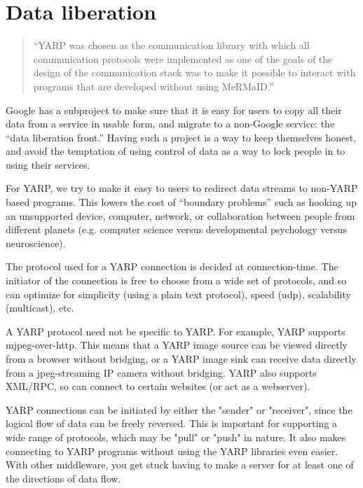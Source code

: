 \documentclass[letterpaper]{article}
\begin{document}
\section{Data liberation}

\begin{quote}
``YARP was chosen as the communication library with
which all communication protocols were implemented as
one of the goals of the design of the communication stack
was to make it possible to interact with programs that are
developed without using MeRMaID.'' \cite{barbosa09mermaid}
\end{quote}


Google has a subproject to make sure that it is easy for users to copy
all their data from a service in usable form, and migrate to a
non-Google service: the ``data liberation front.''  Having such 
a project is a way to keep themselves honest, and avoid the 
temptation of using control of data as a way to lock people in to
using their services.

For YARP, we try to make it easy to users to redirect data streams to
non-YARP based programs.  This lowers the cost of ``boundary
problems'' such as hooking up an unsupported device, computer,
network, or collaboration between people from different planets
(e.g. computer science versus developmental psychology versus
neuroscience).

The protocol used for a YARP connection is decided at connection-time.
The initiator of the connection is free to choose from a wide set of
protocols, and so can optimize for simplicity (using a plain text
protocol), speed (udp), scalability (multicast), etc.

A YARP protocol need not be specific to YARP.  For example, YARP
supports mjpeg-over-http.  This means that a YARP image source can be
viewed directly from a browser without bridging, or a YARP image sink
can receive data directly from a jpeg-streaming IP camera without
bridging.  YARP also supports XML/RPC, so can connect to certain
websites (or act as a webserver).

YARP connections can be initiated by either the "sender" or
"receiver", since the logical flow of data can be freely reversed.
This is important for supporting a wide range of protocols, which may
be "pull" or "push" in nature.  It also makes connecting to YARP
programs without using the YARP libraries even easier.  With other
middleware, you get stuck having to make a server for at least one of
the directions of data flow.
\end{document}
